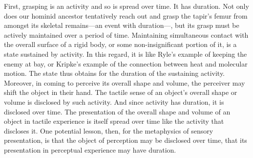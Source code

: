 First, grasping is an activity and so is spread over time. It has duration. Not only does our hominid ancestor tentatively reach out and grasp the tapir's femur from amongst its skeletal remains---an event with duration---, but its grasp must be actively maintained over a period of time. Maintaining simultaneous contact with the overall surface of a rigid body, or some non-insignificant portion of it, is a state sustained by activity. In this regard, it is like Ryle's \citeyearpar[149]{Ryle:1949qr} example of keeping the enemy at bay, or Kripke's \citeyearpar{kripke72} example of the connection between heat and molecular motion. The state thus obtains for the duration of the sustaining activity. Moreover, in coming to perceive its overall shape and volume, the perceiver may shift the object in their hand. The tactile sense of an object's overall shape or volume is disclosed by such activity. And since activity has duration, it is disclosed over time. The presentation of the overall shape and volume of an object in tactile experience is itself spread over time like the activity that discloses it. One potential lesson, then, for the metaphysics of sensory presentation, is that the object of perception may be disclosed over time, that its presentation in perceptual experience may have duration.

